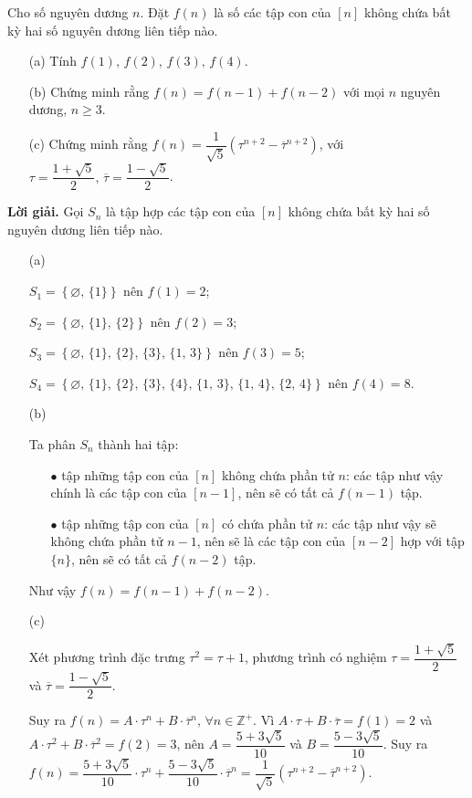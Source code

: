 \begin{tcolorbox}[breakable]
    \begin{baitoan}\label{pb:w05:03}
        Cho số nguyên dương $n$. Đặt $f(n)$ là số các tập con của $[n]$ không chứa bất kỳ hai số nguyên dương liên tiếp nào.

        \begin{enumerate}
            \item[(a)] Tính $f(1),\,f(2),\,f(3),\,f(4)$.
            \item[(b)] Chứng minh rằng $f(n) = f(n-1)+f(n-2)$ với mọi $n$ nguyên dương, $n \geq 3$.
            \item[(c)] Chứng minh rằng $f(n) = \dfrac{1}{\sqrt{5}}\left(\tau^{n+2} - \overline{\tau}^{n+2}\right)$, với $\tau = \dfrac{1+\sqrt{5}}{2},\,\overline{\tau} = \dfrac{1-\sqrt{5}}{2}$.
        \end{enumerate}
    \end{baitoan}
\end{tcolorbox}

\textbf{Lời giải. }Gọi $S_n$ là tập hợp các tập con của $[n]$ không chứa bất kỳ hai số nguyên dương liên tiếp nào.

\begin{enumerate}
    \item[(a)] {
        $S_1 = \left\{\varnothing,\,\{1\}\right\}$ nên $f(1) = 2$;

        $S_2 = \left\{\varnothing,\,\{1\},\,\{2\}\right\}$ nên $f(2) = 3$;

        $S_3 = \left\{\varnothing,\,\{1\},\,\{2\},\,\{3\},\,\{1,\,3\}\right\}$ nên $f(3) = 5$;

        $S_4 = \left\{\varnothing,\,\{1\},\,\{2\},\,\{3\},\,\{4\},\,\{1,\,3\},\,\{1,\,4\},\,\{2,\,4\}\right\}$ nên $f(4) = 8$.
    }
    \item[(b)] {
        Ta phân $S_n$ thành hai tập:
        \begin{enumerate}
            \item[$\bullet$] tập những tập con của $[n]$ không chứa phần tử $n$: các tập như vậy chính là các tập con của $[n-1]$, nên sẽ có tất cả $f(n-1)$ tập.
            \item[$\bullet$] tập những tập con của $[n]$ có chứa phần tử $n$: các tập như vậy sẽ không chứa phần tử $n-1$, nên sẽ là các tập con của $[n-2]$ hợp với tập $\{n\}$, nên sẽ có tất cả $f(n-2)$ tập. 
        \end{enumerate}

        Như vậy $f(n) = f(n-1) + f(n-2)$.
    }
    \item[(c)] {
        Xét phương trình đặc trưng $\tau^2 = \tau + 1$, phương trình có nghiệm $\tau = \dfrac{1+\sqrt{5}}{2}$ và $\overline{\tau} = \dfrac{1-\sqrt{5}}{2}$.

        Suy ra $f(n) = A\cdot \tau^n + B\cdot \overline{\tau}^n,\,\forall n\in \mathbb{Z^+}$. Vì $A\cdot \tau + B\cdot \overline{\tau} = f(1) = 2$ và $A\cdot \tau^2 + B\cdot \overline{\tau}^2 = f(2) = 3$, nên $A = \dfrac{5+3\sqrt{5}}{10}$ và $B = \dfrac{5-3\sqrt{5}}{10}$. Suy ra $f(n) = \dfrac{5+3\sqrt{5}}{10} \cdot \tau^n + \dfrac{5-3\sqrt{5}}{10} \cdot \overline{\tau}^n = \dfrac{1}{\sqrt{5}}\left(\tau^{n+2} - \overline{\tau}^{n+2}\right)$.
    }
\end{enumerate}